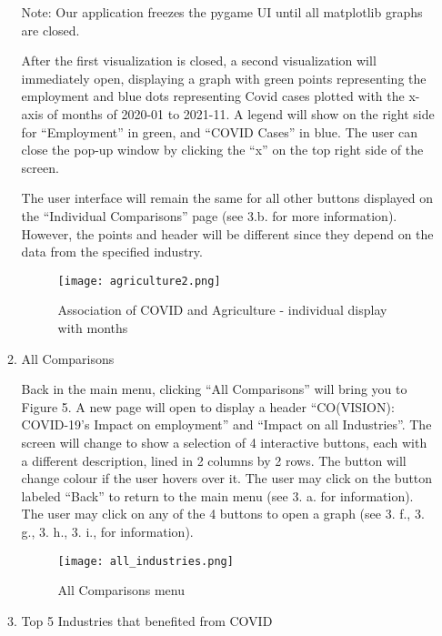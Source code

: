 \documentclass[fontsize=11pt]{article}
\begin{document}
\begin{enumerate}
\begin{enumerate}
Note: Our application freezes the pygame UI until all matplotlib graphs are closed. \newline

After the first visualization is closed, a second visualization will immediately open, displaying a graph with green points representing the employment and blue dots representing Covid cases plotted with the x-axis of months of 2020-01 to 2021-11. A legend will show on the right side for ``Employment” in green, and ``COVID Cases” in blue. The user can close the pop-up window by clicking the ``x” on the top right side of the screen. \newline

The user interface will remain the same for all other buttons displayed on the ``Individual Comparisons” page (see 3.b. for more information). However, the points and header will be different since they depend on the data from the specified industry.


\begin{figure}[h!]
  \caption{Association of COVID and Agriculture - individual display with months}
\centering
\texttt{[image: agriculture2.png]}

\end{figure}

\raggedright

\item All Comparisons

Back in the main menu, clicking ``All Comparisons” will bring you to Figure 5. A new page will open to display a header ``CO(VISION): COVID-19’s Impact on employment” and ``Impact on all Industries”. The screen will change to show a selection of 4 interactive buttons, each with a different description, lined in 2 columns by 2 rows. The button will change colour if the user hovers over it. The user may click on the button labeled ``Back” to return to the main menu (see 3. a. for information). The user may click on any of the 4 buttons to open a graph (see 3. f., 3. g., 3. h., 3. i., for information).


\begin{figure}[h!]
  \caption{All Comparisons menu}
\centering
\texttt{[image: all\_industries.png]}

\end{figure}

\raggedright

\item Top 5 Industries that benefited from COVID


\end{enumerate}
\end{enumerate}
\end{document}
